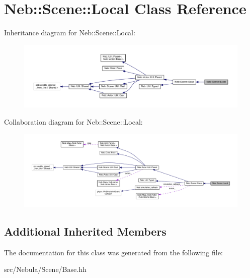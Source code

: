 \hypertarget{classNeb_1_1Scene_1_1Local}{\section{Neb\-:\-:Scene\-:\-:Local Class Reference}
\label{classNeb_1_1Scene_1_1Local}
}


Inheritance diagram for Neb\-:\-:Scene\-:\-:Local\-:
\nopagebreak
\begin{figure}[H]
\begin{center}
\leavevmode
\includegraphics[width=350pt]{classNeb_1_1Scene_1_1Local__inherit__graph}
\end{center}
\end{figure}


Collaboration diagram for Neb\-:\-:Scene\-:\-:Local\-:
\nopagebreak
\begin{figure}[H]
\begin{center}
\leavevmode
\includegraphics[width=350pt]{classNeb_1_1Scene_1_1Local__coll__graph}
\end{center}
\end{figure}
\subsection*{Additional Inherited Members}


The documentation for this class was generated from the following file\-:\begin{DoxyCompactItemize}
\item 
src/\-Nebula/\-Scene/Base.\-hh\end{DoxyCompactItemize}
